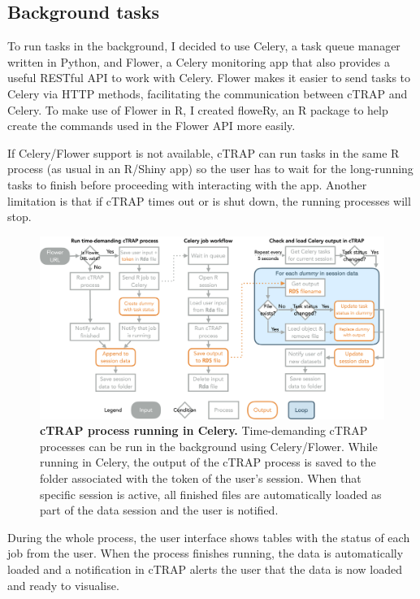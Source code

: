 \subsection{Background tasks}


To run tasks in the background, I decided to use Celery, a task queue manager written in Python, and Flower, a Celery monitoring app that also provides a useful RESTful API to work with Celery. Flower makes it easier to send tasks to Celery via HTTP methods, facilitating the communication between cTRAP and Celery. To make use of Flower in R, I created floweRy, an R package to help create the commands used in the Flower API more easily.

If Celery/Flower support is not available, cTRAP can run tasks in the same R process (as usual in an R/Shiny app) so the user has to wait for the long-running tasks to finish before proceeding with interacting with the app. Another limitation is that if cTRAP times out or is shut down, the running processes will stop.

\begin{figure}[!ht]
  \includegraphics[width=\textwidth]{images/ctrap/celery-job}
  \centering
  \caption[cTRAP process running in Celery]{\textbf{cTRAP process running in Celery.} Time-demanding cTRAP processes can be run in the background using Celery/Flower. While running in Celery, the output of the cTRAP process is saved to the folder associated with the token of the user's session. When that specific session is active, all finished files are automatically loaded as part of the data session and the user is notified.}
\end{figure}

During the whole process, the user interface shows tables with the status of each job from the user. When the process finishes running, the data is automatically loaded and a notification in cTRAP alerts the user that the data is now loaded and ready to visualise.
